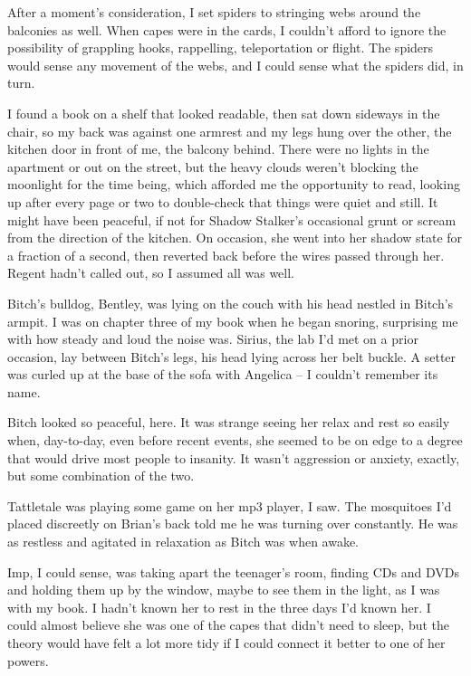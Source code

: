 After a moment's consideration, I set spiders to stringing webs around the balconies as well.  When capes were in the cards, I couldn't afford to ignore the possibility of grappling hooks, rappelling, teleportation or flight.  The spiders would sense any movement of the webs, and I could sense what the spiders did, in turn.



I found a book on a shelf that looked readable, then sat down sideways in the chair, so my back was against one armrest and my legs hung over the other, the kitchen door in front of me, the balcony behind.  There were no lights in the apartment or out on the street, but the heavy clouds weren't blocking the moonlight for the time being, which afforded me the opportunity to read, looking up after every page or two to double-check that things were quiet and still.  It might have been peaceful, if not for Shadow Stalker's occasional grunt or scream from the direction of the kitchen.  On occasion, she went into her shadow state for a fraction of a second, then reverted back before the wires passed through her.  Regent hadn't called out, so I assumed all was well.



Bitch's bulldog, Bentley, was lying on the couch with his head nestled in Bitch's armpit.  I was on chapter three of my book when he began snoring, surprising me with how steady and loud the noise was.  Sirius, the lab I'd met on a prior occasion, lay between Bitch's legs, his head lying across her belt buckle.  A setter was curled up at the base of the sofa with Angelica – I couldn't remember its name.



Bitch looked so peaceful, here.  It was strange seeing her relax and rest so easily when, day-to-day, even before recent events, she seemed to be on edge to a degree that would drive most people to insanity.  It wasn't aggression or anxiety, exactly, but some combination of the two.



Tattletale was playing some game on her mp3 player, I saw.  The mosquitoes I'd placed discreetly on Brian's back told me he was turning over constantly.  He was as restless and agitated in relaxation as Bitch was when awake.



Imp, I could sense, was taking apart the teenager's room, finding CDs and DVDs and holding them up by the window, maybe to see them in the light, as I was with my book.  I hadn't known her to rest in the three days I'd known her.  I could almost believe she was one of the capes that didn't need to sleep, but the theory would have felt a lot more tidy if I could connect it better to one of her powers.



